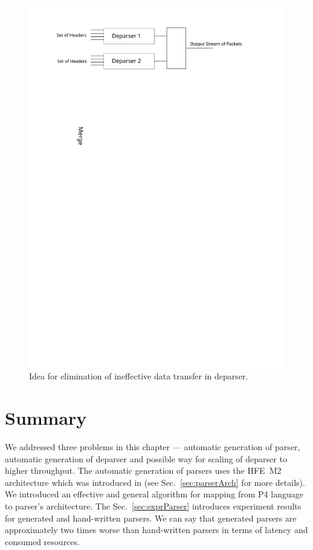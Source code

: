 \begin{figure}[h]
    \centering
    \includegraphics[scale=0.68]{chapters/pic/deparsers-binder}
    \caption{Idea for elimination of ineffective data transfer in deparser.}
    \label{fig:deparserInefElim}
\end{figure}

\section{Summary}
We addressed three problems in this chapter --- automatic generation of parser, automatic generation of deparser and 
possible way for scaling of deparser to higher throughput.
The automatic generation of parsers uses the HFE~M2 architecture which was introduced in \cite{hfem2} 
(see Sec.~\ref{sec:parserArch} for more details).
We introduced an effective and general algorithm for mapping from P4 language to parser's architecture. 
The Sec.~\ref{sec:exprParser} introduces experiment results for generated and hand-written parsers. 
We can say that generated parsers are approximately two times worse than hand-written parsers in 
terms of latency and consumed resources.

